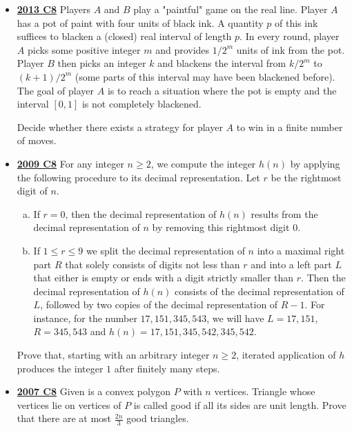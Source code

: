\documentclass[11pt]{scrartcl}
\begin{document}
\begin{itemize}[leftmargin=*]
Determine all possible first moves of the first player after which he has a winning strategy.
    \item \href{https://artofproblemsolving.com/community/c6h597140p3543469}{\textbf{2013 C8}} Players $A$ and $B$ play a "paintful" game on the real line. Player $A$ has a pot of paint with four units of black ink. A quantity $p$ of this ink suffices to blacken a (closed) real interval of length $p$. In every round, player $A$ picks some positive integer $m$ and provides $1/2^m $ units of ink from the pot. Player $B$ then picks an integer $k$ and blackens the interval from $k/2^m$ to $(k+1)/2^m$ (some parts of this interval may have been blackened before). The goal of player $A$ is to reach a situation where the pot is empty and the interval $[0,1]$ is not completely blackened.
    
Decide whether there exists a strategy for player $A$ to win in a finite number of moves.
\newpage
    \item \href{https://artofproblemsolving.com/community/c6h355789p1932933}{\textbf{2009 C8}} For any integer $n\geqslant  2$, we compute the integer $h(n)$ by applying the following procedure to its decimal representation. Let $r$ be the rightmost digit of $n$.
\begin{enumerate}[(a)]
    \item If $r=0$, then the decimal representation of $h(n)$ results from the decimal representation of $n$ by removing this rightmost digit $0$.
    \item If $1\leqslant r \leqslant 9$ we split the decimal representation of $n$ into a maximal right part $R$ that solely consists of digits not less than $r$ and into a left part $L$ that either is empty or ends with a digit strictly smaller than $r$. Then the decimal representation of $h(n)$ consists of the decimal representation of $L$, followed by two copies of the decimal representation of $R-1$. For instance, for the number $17,151,345,543$, we will have $L=17,151$, $R=345,543$ and $h(n)=17,151,345,542,345,542$.
\end{enumerate}
Prove that, starting with an arbitrary integer $n\geqslant  2$, iterated application of $h$ produces the integer $1$ after finitely many steps.
    \item \href{https://artofproblemsolving.com/community/c6h207871p1143934}{\textbf{2007 C8}} Given is a convex polygon $ P$ with $ n$ vertices. Triangle whose vertices lie on vertices of $ P$ is called good if all its sides are unit length. Prove that there are at most $ \frac {2n}{3}$ good triangles.
\end{itemize}
\newpage
\end{document}

